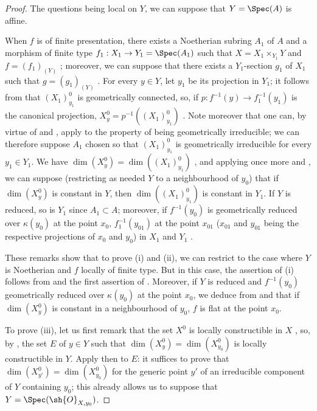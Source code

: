 \begin{proof}
The questions being local on $Y$, we can suppose that $Y=\Spec(A)$ is affine.

When $f$ is of finite presentation, there exists a Noetherian subring $A_1$ of $A$ and a morphism of finite type $f_1:X_1\to Y_1=\Spec(A_1)$ such that $X=X_1\times_{Y_1}Y$ and $f=(f_1)_{(Y)}$ ; moreover, we can suppose that there exists a $Y_1$-section $g_1$ of $X_1$ such that $g=(g_1)_{(Y)}$ .
For every $y\in Y$, let $y_1$ be its projection in $Y_1$; it follows from  that $(X_1)_{y_1}^0$ is geometrically connected, so, if $p:f^{-1}(y)\to f_1^{-1}(y_1)$ is the canonical projection, $X_y^0=p^{-1}((X_1)_{y_1}^0)$ .
Note moreover that one can, by virtue of  and , apply  to the property of being geometrically irreducible; we can therefore suppose $A_1$ chosen so that $(X_1)_{y_1}^0$ is geometrically irreducible for every $y_1\in Y_1$.
We have $\dim(X_y^0)=\dim((X_1)_{y_1}^0)$ , and applying once more  and , we can suppose (restricting as needed $Y$ to a neighbourhood of $y_0$) that if $\dim(X_y^0)$ is constant in $Y$, then $\dim((X_1)_{y_1}^0)$ is constant in $Y_1$.
If $Y$ is reduced, so is $Y_1$ since $A_1\subset A$; moreover, if $f^{-1}(y_0)$ is geometrically reduced over $\kappa(y_0)$ at the point $x_0$, $f_1^{-1}(y_{01})$ at the point $x_{01}$ ($x_{01}$ and $y_{01}$ being the respective projections of $x_0$ and $y_0$) in $X_1$ and $Y_1$ .

These remarks show that to prove (i) and (ii), we can restrict to the case where $Y$ is Noetherian and $f$ locally of finite type.
But in this case, the assertion of (i) follows from  and the first assertion of .
Moreover, if $Y$ is reduced
and $f^{-1}(y_0)$ geometrically reduced over $\kappa(y_0)$ at the point $x_0$, we deduce from  and  that if $\dim(X_y^0)$ is constant in a neighbourhood of $y_0$, $f$ is flat at the point $x_0$.

To prove (iii), let us first remark that the set $X^0$ is locally constructible in $X$ , so, by , the set $E$ of $y\in Y$ such that $\dim(X_y^0)=\dim(X_{y_0}^0)$ is locally constructible in $Y$.
Apply then  to $E$: it suffices to prove that $\dim(X_{y'}^0)=\dim(X_{y_0}^0)$ for the generic point $y'$ of an irreducible component of $Y$ containing $y_0$; this already allows us to suppose that $Y=\Spec(\sh{O}_{X,y_0})$.


\end{proof}
